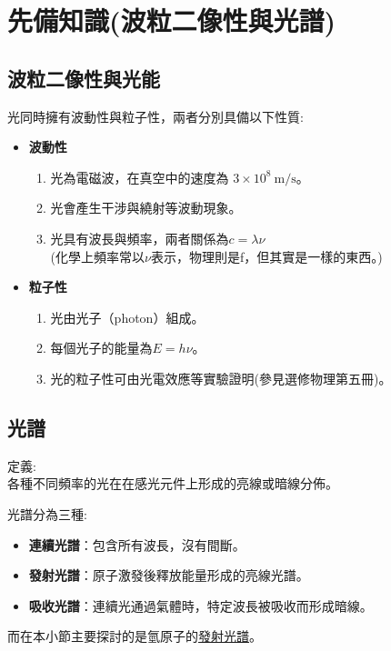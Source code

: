 \section{先備知識(波粒二像性與光譜)}
\subsection{波粒二像性與光能}

光同時擁有波動性與粒子性，兩者分別具備以下性質:
\begin{itemize}
    \item \textbf{波動性}
    \begin{enumerate}
        \item 光為電磁波，在真空中的速度為 $3\times10^8\ \mathrm{m/s}$。
        \item 光會產生干涉與繞射等波動現象。
        \item 光具有波長與頻率，兩者關係為$c=\lambda \nu$\\
        (化學上頻率常以$\nu$表示，物理則是f，但其實是一樣的東西。)
    \end{enumerate}

    \item \textbf{粒子性}
    \begin{enumerate}
        \item 光由光子（photon）組成。
        \item 每個光子的能量為$E=h\nu$。
        \item 光的粒子性可由光電效應等實驗證明(參見選修物理第五冊)。
    \end{enumerate}
\end{itemize}

\subsection{光譜}

\begin{trick}
定義:\\
各種不同頻率的光在在感光元件上形成的亮線或暗線分佈。
\end{trick}
光譜分為三種:
\begin{itemize}
    \item \textbf{連續光譜}：包含所有波長，沒有間斷。
    \item \textbf{發射光譜}：原子激發後釋放能量形成的亮線光譜。
    \item \textbf{吸收光譜}：連續光通過氣體時，特定波長被吸收而形成暗線。
\end{itemize}
而在本小節主要探討的是氫原子的\underline{發射光譜}。




